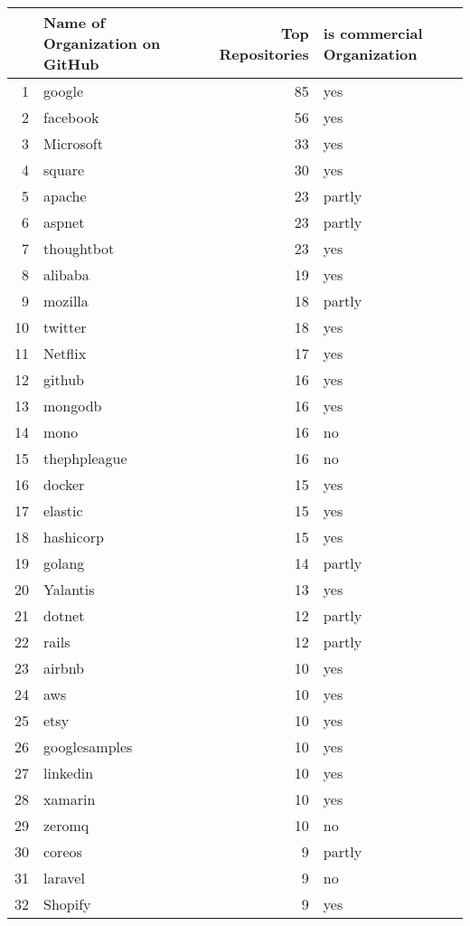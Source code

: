 {\footnotesize
\begin{longtable}{rlrl}

  \hline
 & Name of Organization on GitHub & Top Repositories & is commercial Organization \\
  \hline
  \endhead
  1 & google &  85 & yes \\
    2 & facebook &  56 & yes \\
    3 & Microsoft &  33 & yes \\
    4 & square &  30 & yes \\
    5 & apache &  23 & partly \\
    6 & aspnet &  23 & partly \\
    7 & thoughtbot &  23 & yes \\
    8 & alibaba &  19 & yes \\
    9 & mozilla &  18 & partly \\
    10 & twitter &  18 & yes \\
    11 & Netflix &  17 & yes \\
    12 & github &  16 & yes \\
    13 & mongodb &  16 & yes \\
    14 & mono &  16 & no \\
    15 & thephpleague &  16 & no \\
    16 & docker &  15 & yes \\
    17 & elastic &  15 & yes \\
    18 & hashicorp &  15 & yes \\
    19 & golang &  14 & partly \\
    20 & Yalantis &  13 & yes \\
    21 & dotnet &  12 & partly \\
    22 & rails &  12 & partly \\
    23 & airbnb &  10 & yes \\
    24 & aws &  10 & yes \\
    25 & etsy &  10 & yes \\
    26 & googlesamples &  10 & yes \\
    27 & linkedin &  10 & yes \\
    28 & xamarin &  10 & yes \\
    29 & zeromq &  10 & no \\
    30 & coreos &   9 & partly \\
    31 & laravel &   9 & no \\
    32 & Shopify &   9 & yes \\

\end{longtable}}
